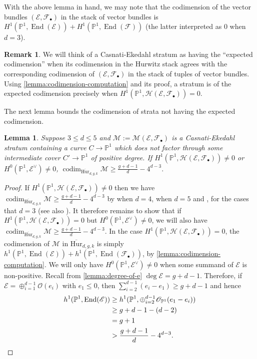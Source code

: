 \documentclass[12 pt]{amsart}
\newcommand{\rboxed}[1]{#1}
\theoremstyle{plain}
\newtheorem{lemma}[theorem]{Lemma}
\theoremstyle{definition}
\newtheorem{remark}[theorem]{Remark}
\theoremstyle{remark}
\numberwithin{equation}{section}
\newcommand\bp{\mathbb P}
\newcommand\sce{\mathscr E}
\newcommand\scf{\mathscr F}
\newcommand\sch{\mathscr H}
\newcommand\sco{\mathscr O}
\newcommand\bighurg[3]{\overline{\mathrm{Hur}}_{#1,#2, #3}} %
\newcommand\ce{\mathscr M} %
\DeclareMathOperator\codim{codim}
\DeclareMathOperator\End{End}
\begin{document}
With the above lemma in hand, we may note that the codimension of
the vector bundles $(\sce, \scf_\bullet)$ in the stack of vector bundles
is $H^1(\bp^1, \End(\sce)) + H^1(\bp^1, \End(\scf))$ (the latter interpreted as
$0$ when $d  =3$).

\begin{remark}
	\label{remark:expected-codimension}
	We will think of a Casnati-Ekedahl stratum as having the ``expected codimension''
when its codimension in the Hurwitz stack agrees with the corresponding
codimension of $(\sce, \scf_\bullet)$ in the stack of tuples of vector bundles.
Using \autoref{lemma:codimension-computation} and its proof, a stratum is of the expected
codimension precisely when $H^1(\bp^1, \sch(\sce, \scf_\bullet)) = 0$.
\end{remark}
The next lemma bounds the codimension of strata not having the expected
codimension.

\begin{lemma} \label{lemma:unexpected-codimension-bound} Suppose $3 \leq d \leq
	5$ and $\rboxed{\ce} := \ce(\sce, \scf_\bullet)$ is a Casnati-Ekedahl
	stratum containing a curve $C \to \bp^1$ which does not factor through
	some intermediate cover $C' \to \bp^1$ of positive degree.  If
$H^1(\bp^1, \sch(\sce, \scf_\bullet)) \neq 0$ or $H^0(\bp^1, \sce^\vee) \neq 0$,
$\codim_{\bighurg d g k} \ce \geq \frac{g + d  -1}{d} - 4^{d-3}.$ \end{lemma}
\begin{proof} If $H^1(\bp^1, \sch(\sce, \scf_\bullet)) \neq 0$ then we have
	$\codim_{\bighurg d g k} \ce \geq \frac{g + d  -1}{d} - 4^{d-3}$ by
	\cite[Lem.\ 5.8]{canningL:tautological-classes-on-low-degree-hurwitz-spaces}
	when $d = 4$,
	\cite[Lem.\
	5.12]{canningL:tautological-classes-on-low-degree-hurwitz-spaces} when $d
	= 5$ and
	\cite[(6.2)]{miranda:triple-covers-in-algebraic-geometry},
	for the cases that $d=3$
	(see also \cite[Prop.\ 2.2]{bolognesiV:stacks-of-trigonal-curves}).  
	It therefore remains to
	show that if $H^1(\bp^1, \sch(\sce, \scf_\bullet)) = 0$ 
	but $H^0(\bp^1,
	\sce^\vee) \neq 0$, we will also have $\codim_{\bighurg d g k} \ce \geq
	\frac{g + d  -1}{d} - 4^{d-3}$.  In the case $H^1(\bp^1, \sch(\sce,
	\scf_\bullet)) = 0$, the codimension of $\ce$ in $\bighurg d g k$ is simply
	$h^1(\bp^1, \End(\sce)) + h^1(\bp^1, \End(\scf_\bullet))$, by
	\autoref{lemma:codimension-computation}.  We will only have $H^0(\bp^1,
	\sce^\vee) \neq 0$ when some summand of $\sce$ is non-positive.  
	Recall from \autoref{lemma:degree-of-e} 
	$\deg \sce = g + d- 1$.
	Therefore,
	if
	$\sce = \oplus_{i=1}^{d-1} \sco(e_i)$ with $e_1 \leq 0$, then
	$\sum_{i=2}^{d-1} (e_i - e_1) \geq g + d -1$ and hence \begin{align*}
h^1(\bp^1, \End(\sce)) &\geq h^1(\bp^1, \oplus_{i=2}^{d-1} \sco_{\bp^1}(e_1 -
e_i)) \\
&\geq g + d -1 - (d-2) \\
&= g + 1 \\
&> \frac{g + d  -1}{d} - 4^{d-3}. \qedhere \end{align*}
\end{proof}
\end{document}
